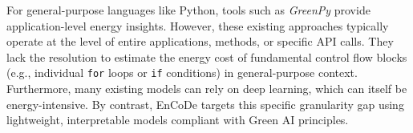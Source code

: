 For general-purpose languages like Python, tools such as \textit{GreenPy} \cite{Reya2023GreenPyEA} provide application-level energy insights. However, these existing approaches typically operate at the level of entire applications, methods, or specific API calls. They lack the resolution to estimate the energy cost of fundamental control flow blocks (e.g., individual \texttt{for} loops or \texttt{if} conditions) in general-purpose context.  Furthermore, many existing models can rely on deep learning, which can itself be energy-intensive. By contrast, EnCoDe targets this specific granularity gap using lightweight, interpretable models compliant with Green AI principles. 


